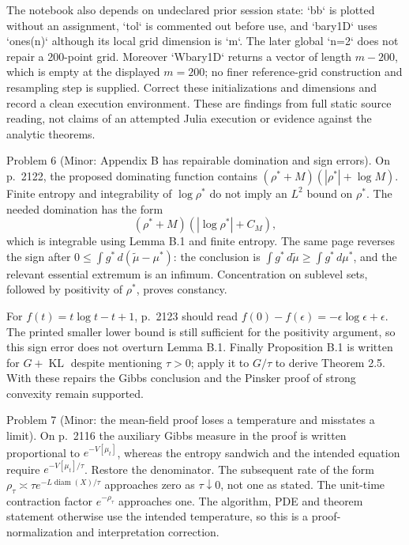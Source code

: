 \documentclass[10pt]{article}
\begin{document}
The notebook also depends on undeclared prior session state: `bb` is plotted without an assignment, `tol` is commented out before use, and `bary1D` uses `ones(n)` although its local grid dimension is `m`. The later global `n=2` does not repair a 200-point grid. Moreover `Wbary1D` returns a vector of length \(m-200\), which is empty at the displayed \(m=200\); no finer reference-grid construction and resampling step is supplied. Correct these initializations and dimensions and record a clean execution environment. These are findings from full static source reading, not claims of an attempted Julia execution or evidence against the analytic theorems.\par
Problem 6 (Minor: Appendix B has repairable domination and sign errors).  On p. 2122, the proposed dominating function contains \((\rho^*+M)(|\rho^*|+\log M)\). Finite entropy and integrability of \(\log\rho^*\) do not imply an \(L^2\) bound on \(\rho^*\). The needed domination has the form \[(\rho^*+M)(|\log\rho^*|+C_M),\] which is integrable using Lemma B.1 and finite entropy. The same page reverses the sign after \(0\le\int g^*\,d(\widetilde\mu-\mu^*)\): the conclusion is \(\int g^*\,d\widetilde\mu\ge\int g^*\,d\mu^*\), and the relevant essential extremum is an infimum. Concentration on sublevel sets, followed by positivity of \(\rho^*\), proves constancy.\par
For \(f(t)=t\log t-t+1\), p. 2123 should read \(f(0)-f(\epsilon)=-\epsilon\log\epsilon+\epsilon\). The printed smaller lower bound is still sufficient for the positivity argument, so this sign error does not overturn Lemma B.1. Finally Proposition B.1 is written for \(G+\mathop{\mathrm{KL}}\) despite mentioning \(\tau>0\); apply it to \(G/\tau\) to derive Theorem 2.5. With these repairs the Gibbs conclusion and the Pinsker proof of strong convexity remain supported.\par
Problem 7 (Minor: the mean-field proof loses a temperature and misstates a limit).  On p. 2116 the auxiliary Gibbs measure in the proof is written proportional to \(e^{-V[\mu_t]}\), whereas the entropy sandwich and the intended equation require \(e^{-V[\mu_t]/\tau}\). Restore the denominator. The subsequent rate of the form \(\rho_\tau\asymp\tau e^{-L\operatorname{diam}(X)/\tau}\) approaches zero as \(\tau\downarrow0\), not one as stated. The unit-time contraction factor \(e^{-\rho_\tau}\) approaches one. The algorithm, PDE and theorem statement otherwise use the intended temperature, so this is a proof-normalization and interpretation correction.\par
\end{document}
